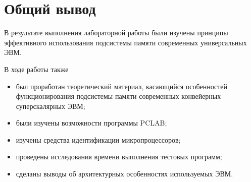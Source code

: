 \chapter*{Общий вывод}

В результате выполнения лабораторной работы были изучены принципы эффективного использования подсистемы памяти современных универсальных ЭВМ.

В ходе работы также
\begin{itemize}
    \item был проработан теоретический материал, касающийся особенностей функционирования подсистемы памяти современных конвейерных суперскалярных ЭВМ;
    \item были изучены возможности программы PCLAB;
    \item изучены средства идентификации микропроцессоров;
    \item проведены исследования времени выполнения тестовых программ;
    \item сделаны выводы об архитектурных особенностях используемых ЭВМ.
\end{itemize}
